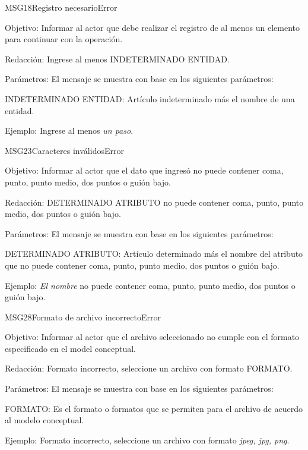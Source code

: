 \begin{mensaje}{MSG18}{Registro necesario}{Error}
    \item[Objetivo:] Informar al actor que debe realizar el registro de al menos un elemento para continuar con la operación.
    \item[Redacción:] Ingrese al menos INDETERMINADO ENTIDAD.
    \item[Parámetros:] El mensaje se muestra con base en los siguientes parámetros:
    \begin{Citemize}
	\item INDETERMINADO ENTIDAD: Artículo indeterminado más el nombre de una entidad.
    \end{Citemize}
    \item[Ejemplo:] Ingrese al menos {\em un paso}.
\end{mensaje}
\begin{mensaje}{MSG23}{Caracteres inválidos}{Error}
    \item[Objetivo:] Informar al actor que el dato que ingresó no puede contener coma, punto, punto medio, dos puntos o guión bajo.
    \item[Redacción:] DETERMINADO ATRIBUTO no puede contener coma, punto, punto medio, dos puntos o guión bajo.
    \item[Parámetros:] El mensaje se muestra con base en los siguientes parámetros:
    \begin{Citemize}
	\item DETERMINADO ATRIBUTO: Artículo determinado más el nombre del atributo que no puede contener coma, punto, punto medio, dos puntos o guión bajo.
    \end{Citemize}
    \item[Ejemplo:] { \em El nombre} no puede contener coma, punto, punto medio, dos puntos o guión bajo.
\end{mensaje}
\begin{mensaje}{MSG28}{Formato de archivo incorrecto}{Error}
    \item[Objetivo:] Informar al actor que el archivo seleccionado no cumple con el formato especificado en el model conceptual.
    \item[Redacción:] Formato incorrecto, seleccione un archivo con formato FORMATO.
    \item[Parámetros:] El mensaje se muestra con base en los siguientes parámetros:
    \begin{Citemize}
	\item FORMATO: Es el formato o formatos que se permiten para el archivo de acuerdo al modelo conceptual.
    \end{Citemize}
    \item[Ejemplo:] Formato incorrecto, seleccione un archivo con formato {\em jpeg, jpg, png}.
\end{mensaje}
